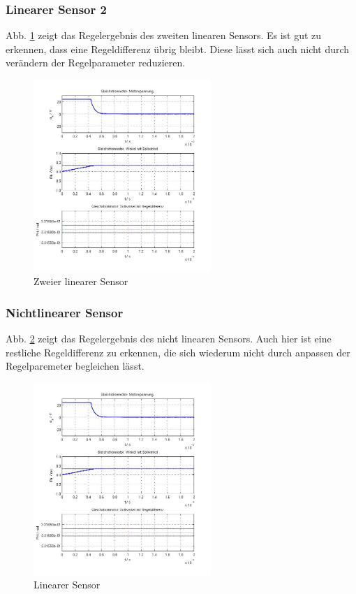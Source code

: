 \subsubsection{Linearer Sensor 2}
\label{chap:sensorregelung2}
Abb. \ref{fig:linear2} zeigt das Regelergebnis des zweiten linearen Sensors.
Es ist gut zu erkennen, dass eine Regeldifferenz übrig bleibt.
Diese lässt sich auch nicht durch verändern der Regelparameter reduzieren.
\begin{figure}[!h]
	\centering
	\includegraphics[width=0.6\textwidth]{Sensor_10_1_100_linear2.jpg}
	\caption{Zweier linearer Sensor}
	\label{fig:linear2}
\end{figure}

\subsubsection{Nichtlinearer Sensor}
\label{chap:sensorregelung3}
Abb. \ref{fig:nonlinear} zeigt das Regelergebnis des nicht linearen Sensors.
Auch hier ist eine restliche Regeldifferenz zu erkennen, die sich wiederum nicht durch anpassen der Regelparemeter begleichen lässt.
\begin{figure}[!h]
	\centering
	\includegraphics[width=0.6\textwidth]{Sensor_10_1_100_nonlinear00001.jpg}
	\caption{Linearer Sensor}
	\label{fig:nonlinear}
\end{figure}